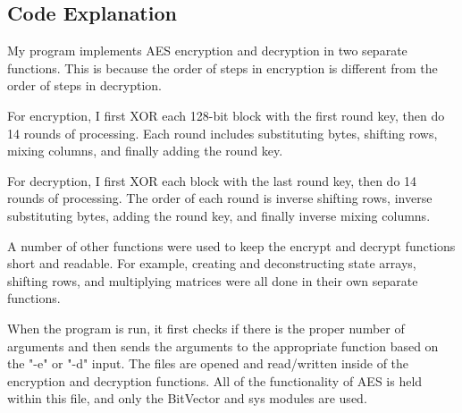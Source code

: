 \documentclass[11pt]{article}
\begin{document}
\subsection{Code Explanation}

My program implements AES encryption and decryption in two separate functions. This is because the order of steps in encryption is different from the order of steps in decryption. 

For encryption, I first XOR each 128-bit block with the first round key, then do 14 rounds of processing. Each round includes substituting bytes, shifting rows, mixing columns, and finally adding the round key. 

For decryption, I first XOR each block with the last round key, then do 14 rounds of processing. The order of each round is inverse shifting rows, inverse substituting bytes, adding the round key, and finally inverse mixing columns.

A number of other functions were used to keep the encrypt and decrypt functions short and readable. For example, creating and deconstructing state arrays, shifting rows, and multiplying matrices were all done in their own separate functions.

When the program is run, it first checks if there is the proper number of arguments and then sends the arguments to the appropriate function based on the "-e" or "-d" input. The files are opened and read/written inside of the encryption and decryption functions. All of the functionality of AES is held within this file, and only the BitVector and sys modules are used.
\end{document}

